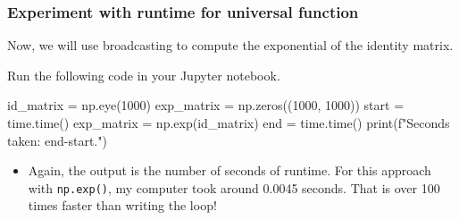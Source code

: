 \documentclass{beamer}
\newenvironment{codeblock}
    {\hfill\begin{beamerboxesrounded}[lower=codecol, width=0.8\textwidth]
    \medskip

    }
    { 
    \end{beamerboxesrounded}\hfill
    }
\theoremstyle{example}
\newcommand{\ttt}[1]{{\small\texttt{#1}}}
\begin{document}
\begin{frame}[fragile]
\frametitle{Experiment with runtime for universal function}
Now, we will use broadcasting to compute the exponential of the identity matrix.

Run the following code in your Jupyter notebook.

\begin{codeblock}

\begin{python}
id_matrix = np.eye(1000)
exp_matrix = np.zeros((1000, 1000))
start = time.time()
exp_matrix = np.exp(id_matrix)
end = time.time()
print(f"Seconds taken: {end-start}.")
\end{python}

\end{codeblock}

\vspace*{12pt}
\begin{itemize}
    \item[] Again, the output is the number of seconds of runtime. For this approach with \ttt{np.exp()}, my computer took around 0.0045 seconds. That is over 100 times faster than writing the loop!
\end{itemize}
\end{frame}
\end{document}
